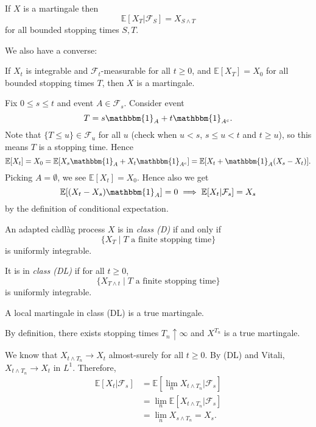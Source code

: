 \documentclass[12pt]{article}
\begin{document}
\begin{theorem}
	If $X$ is a martingale then
	\[
	\mathbb{E}[X_T | \mathcal{F}_S] = X_{S \wedge T}
	\]
	for all bounded stopping times $S, T$.
\end{theorem}

We also have a converse:
\begin{proposition}
	If $X_t$ is integrable and $\mathcal{F}_t$-measurable for all $t \geq 0$, and $\mathbb{E}[X_T] = X_0$ for all bounded stopping times $T$, then $X$ is a martingale.
\end{proposition}

\begin{proofbox}
	Fix $0 \leq s \leq t$ and event $A \in \mathcal{F}_s$. Consider event
	\[
	T = s \mathbbm{1}_{A} + t \mathbbm{1}_{A^{c}}.
	\]
	Note that $\{T \leq u\} \in \mathcal{F}_u$ for all $u$ (check when $u < s$, $s \leq u < t$ and $t \geq u$), so this means $T$ is a stopping time. Hence
	\[
		\mathbb{E} [X_t] = X_0 = \mathbb{E}[X_s \mathbbm{1}_{A} + X_t \mathbbm{1}_{A^{c}}] = \mathbb{E}[X_t + \mathbbm{1}_{A}(X_s - X_t)].
	\]
	Picking $A = \emptyset$, we see $\mathbb{E}[X_t] = X_0$. Hence also we get
	\[
	\mathbb{E}[(X_t - X_s)\mathbbm{1}_{A}] = 0 \implies \mathbb{E}[X_t | \mathcal{F}_s] = X_s
	\]
	by the definition of conditional expectation.
\end{proofbox}

\begin{definition}
	An adapted c\`adl\`ag process $X$ is in \emph{class (D)} if and only if
	\[
		\{X_T \mid T \text{ a finite stopping time}\}
	\]
	is uniformly integrable.

	It is in \emph{class (DL)} if for all $t \geq 0$,
	\[
		\{X_{T \wedge t} \mid T \text{ a finite stopping time}\}
	\]
	is uniformly integrable.
\end{definition}

\begin{theorem}
	A local martingale in class (DL) is a true martingale.
\end{theorem}

\begin{proofbox}
	By definition, there exists stopping times $T_n \uparrow \infty$ and $X^{T_n}$ is a true martingale.

	We know that $X_{t \wedge T_n} \to X_t$ almost-surely for all $t \geq 0$. By (DL) and Vitali, $X_{t \wedge T_n} \to X_t$ in $L^{1}$. Therefore,
	\begin{align*}
		\mathbb{E}[X_t | \mathcal{F}_s] &= \mathbb{E}[\lim_n X_{t \wedge T_n} | \mathcal{F}_s] \\
						&= \lim_n \mathbb{E}[X_{t \wedge T_n} | \mathcal{F}_s] \\
						&= \lim_n X_{s \wedge T_n} = X_s.
	\end{align*}
\end{proofbox}
\end{document}
